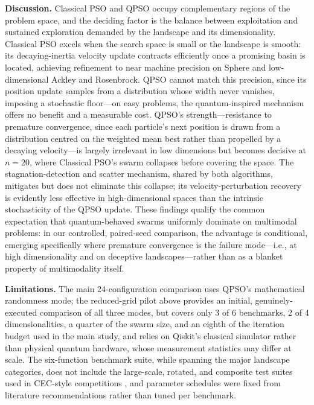 \documentclass[11pt]{article}
\begin{document}
\textbf{Discussion.} Classical PSO and QPSO occupy complementary regions of the problem space, and the deciding factor is the balance between exploitation and sustained exploration demanded by the landscape and its dimensionality. Classical PSO excels when the search space is small or the landscape is smooth: its decaying-inertia velocity update contracts efficiently once a promising basin is located, achieving refinement to near machine precision on Sphere and low-dimensional Ackley and Rosenbrock. QPSO cannot match this precision, since its position update samples from a distribution whose width never vanishes, imposing a stochastic floor---on easy problems, the quantum-inspired mechanism offers no benefit and a measurable cost. QPSO's strength---resistance to premature convergence, since each particle's next position is drawn from a distribution centred on the weighted mean best rather than propelled by a decaying velocity---is largely irrelevant in low dimensions but becomes decisive at $n=20$, where Classical PSO's swarm collapses before covering the space. The stagnation-detection and scatter mechanism, shared by both algorithms, mitigates but does not eliminate this collapse; its velocity-perturbation recovery is evidently less effective in high-dimensional spaces than the intrinsic stochasticity of the QPSO update. These findings qualify the common expectation that quantum-behaved swarms uniformly dominate on multimodal problems: in our controlled, paired-seed comparison, the advantage is conditional, emerging specifically where premature convergence is the failure mode---i.e., at high dimensionality and on deceptive landscapes---rather than as a blanket property of multimodality itself.

\textbf{Limitations.} The main 24-configuration comparison uses QPSO's mathematical randomness mode; the reduced-grid pilot above provides an initial, genuinely-executed comparison of all three modes, but covers only 3 of 6 benchmarks, 2 of 4 dimensionalities, a quarter of the swarm size, and an eighth of the iteration budget used in the main study, and relies on Qiskit's classical simulator rather than physical quantum hardware, whose measurement statistics may differ at scale. The six-function benchmark suite, while spanning the major landscape categories, does not include the large-scale, rotated, and composite test suites used in CEC-style competitions \cite{liang2013}, and parameter schedules were fixed from literature recommendations rather than tuned per benchmark.

\vspace{-0.3em}
\end{document}
